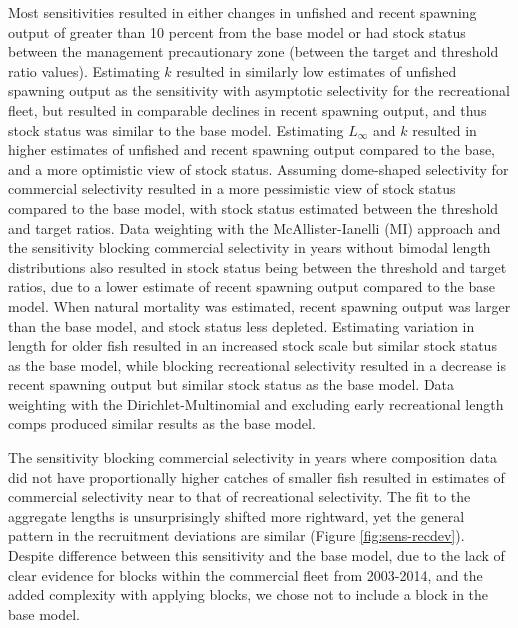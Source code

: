 \documentclass[11pt,
  english,
  a4paper,
]{article}
\begin{document}
Most sensitivities resulted in either changes in unfished and recent spawning output of greater than 10 percent from the base model or had stock status between the management precautionary zone (between the target and threshold ratio values). Estimating {\(k\)\leavevmode\tagmcend\tagstructend} resulted in similarly low estimates of unfished spawning output as the sensitivity with asymptotic selectivity for the recreational fleet, but resulted in comparable declines in recent spawning output, and thus stock status was similar to the base model. Estimating {\(L_{\infty}\)\leavevmode\tagmcend\tagstructend} and {\(k\)\leavevmode\tagmcend\tagstructend} resulted in higher estimates of unfished and recent spawning output compared to the base, and a more optimistic view of stock status. Assuming dome-shaped selectivity for commercial selectivity resulted in a more pessimistic view of stock status compared to the base model, with stock status estimated between the threshold and target ratios. Data weighting with the McAllister-Ianelli (MI) approach and the sensitivity blocking commercial selectivity in years without bimodal length distributions also resulted in stock status being between the threshold and target ratios, due to a lower estimate of recent spawning output compared to the base model. When natural mortality was estimated, recent spawning output was larger than the base model, and stock status less depleted. Estimating variation in length for older fish resulted in an increased stock scale but similar stock status as the base model, while blocking recreational selectivity resulted in a decrease is recent spawning output but similar stock status as the base model. Data weighting with the Dirichlet-Multinomial and excluding early recreational length comps produced similar results as the base model.

\leavevmode\tagmcend\tagstructend\par


The sensitivity blocking commercial selectivity in years where composition data did not have proportionally higher catches of smaller fish resulted in estimates of commercial selectivity near to that of recreational selectivity. The fit to the aggregate lengths is unsurprisingly shifted more rightward, yet the general pattern in the recruitment deviations are similar (Figure \ref{fig:sens-recdev}). Despite difference between this sensitivity and the base model, due to the lack of clear evidence for blocks within the commercial fleet from 2003-2014, and the added complexity with applying blocks, we chose not to include a block in the base model.
\end{document}
